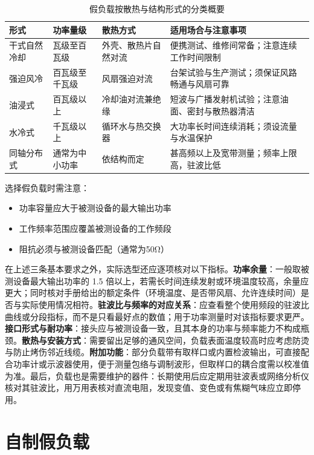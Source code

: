 \begin{table}[htbp]
\centering
\caption{假负载按散热与结构形式的分类概要}
\begin{tabular}{|p{2.4cm}|p{3.0cm}|p{3.2cm}|p{4.0cm}|}
\hline
\textbf{形式} & \textbf{功率量级} & \textbf{散热方式} & \textbf{适用场合与注意事项} \\
\hline
干式自然冷却 & 瓦级至百瓦级 & 外壳、散热片自然对流 & 便携测试、维修间常备；注意连续工作时间限制 \\
\hline
强迫风冷 & 百瓦级至千瓦级 & 风扇强迫对流 & 台架试验与生产测试；须保证风路畅通与风扇可靠 \\
\hline
油浸式 & 百瓦级以上 & 冷却油对流兼绝缘 & 短波与广播发射机试验；注意油面、密封与散热器清洁 \\
\hline
水冷式 & 千瓦级以上 & 循环水与热交换器 & 大功率长时间连续消耗；须设流量与水温保护 \\
\hline
同轴分布式 & 通常为中小功率 & 依结构而定 & 甚高频以上及宽带测量；频率上限高，驻波比低 \\
\hline
\end{tabular}
\end{table}

选择假负载时需注意：
\begin{itemize}
    \item 功率容量应大于被测设备的最大输出功率
    \item 工作频率范围应覆盖被测设备的工作频段
    \item 阻抗必须与被测设备匹配（通常为50Ω）
\end{itemize}

在上述三条基本要求之外，实际选型还应逐项核对以下指标。\textbf{功率余量}：一般取被测设备最大输出功率的 1.5 倍以上，若需长时间连续发射或环境温度较高，余量应更大；同时核对手册给出的额定条件（环境温度、是否带风扇、允许连续时间）是否与实际使用情况相符。\textbf{驻波比与频率的对应关系}：应查看整个使用频段的驻波比曲线或分段指标，而不是只看最好点的数值；用于功率测量时对该指标要求更严。\textbf{接口形式与耐功率}：接头应与被测设备一致，且其本身的功率与频率能力不构成瓶颈。\textbf{散热与安装方式}：需要留出足够的通风空间，负载表面温度较高时应考虑防烫与防止烤伤邻近线缆。\textbf{附加功能}：部分负载带有取样口或内置检波输出，可直接配合功率计或示波器使用，便于测量包络与调制波形，但取样口的耦合度需以校准值为准。最后，负载也是需要维护的器件：长期使用后应定期用驻波表或网络分析仪核对其驻波比，用万用表核对直流电阻，发现变值、变色或有焦糊气味应立即停用。

\section{自制假负载}
\label{sec:diy_dummy_load}

